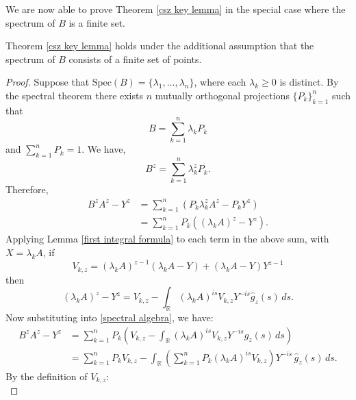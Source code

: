    We are now able to prove Theorem \ref{csz key lemma} in the special case where the spectrum of $B$ is a finite set.
    \begin{lem}\label{second integral formula} 
        Theorem \ref{csz key lemma} holds under the additional assumption that the spectrum of $B$ consists of a finite set of points.
    \end{lem}
    \begin{proof} 
        Suppose that $\mathrm{Spec}(B) = \{\lambda_1,\ldots,\lambda_n\}$, where each $\lambda_k\geq 0$ is distinct. By the spectral theorem
        there exists $n$ mutually orthogonal projections $\{P_k\}_{k=1}^n$ such that
        \begin{equation*}
            B = \sum_{k=1}^n \lambda_kP_k
        \end{equation*}
        and $\sum_{k=1}^n P_k = 1$. We have,
        \begin{equation*}
            B^{z} = \sum_{k=1}^n \lambda_k^z P_k.
        \end{equation*}
        Therefore,
        \begin{align}
            B^zA^z-Y^z &= \sum_{k=1}^n (P_k\lambda_k^zA^z-P_kY^z)\nonumber\\
                       &= \sum_{k=1}^n P_k((\lambda_kA)^z-Y^z)\label{spectral algebra}.
        \end{align}
        Applying Lemma \ref{first integral formula} to each term in the above sum, with $X = \lambda_kA$, if 
        \begin{equation*}
            V_{k,z} = (\lambda_kA)^{z-1}(\lambda_kA-Y)+(\lambda_k A-Y)Y^{z-1}
        \end{equation*}
        then
        \begin{equation*}
            (\lambda_kA)^z-Y^z = V_{k,z}-\int_{\mathbb{R}} (\lambda_kA)^{is}V_{k,z}Y^{-is}\widehat{g}_z(s)\,ds.
        \end{equation*}
        Now substituting into \eqref{spectral algebra}, we have:
        \begin{align*}
            B^zA^z-Y^z &= \sum_{k=1}^n P_k\left(V_{k,z}-\int_{\mathbb{R}} (\lambda_kA)^{is}V_{k,z}Y^{-is}\widehat{g}_z(s)\,ds\right)\\
                       &= \sum_{k=1}^n P_kV_{k,z}-\int_{\mathbb{R}} \left(\sum_{k=1}^n P_k(\lambda_kA)^{is}V_{k,z}\right)Y^{-is}\,\widehat{g}_z(s)\,ds.
        \end{align*}
        By the definition of $V_{k,z}$:
        \begin{equation*}

\end{equation*}
\end{proof}
